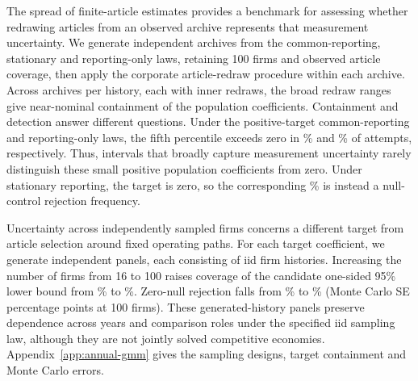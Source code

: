 The spread of finite-article estimates provides a benchmark for assessing
whether redrawing articles from an observed archive represents that
measurement uncertainty.
We generate independent archives from the common-reporting, stationary and
reporting-only laws, retaining 100 firms and observed article coverage, then
apply the corporate article-redraw procedure within each archive.
Across  archives per history, each
with  inner redraws, the broad redraw
ranges give near-nominal containment of the population coefficients.
Containment and detection answer different questions.
Under the positive-target common-reporting and reporting-only laws, the fifth
percentile exceeds zero in
\% and
\% of attempts, respectively.
Thus, intervals that broadly capture measurement uncertainty rarely distinguish
these small positive population coefficients from zero.
Under stationary reporting, the target is zero, so the corresponding
\% is instead a null-control
rejection frequency.

Uncertainty across independently sampled firms concerns a different target
from article selection around fixed operating paths.
For each target coefficient, we generate
 independent panels, each consisting
of iid firm histories.
Increasing the number of firms from 16 to 100 raises coverage of the
candidate one-sided 95\% lower bound from
\% to
\%.
Zero-null rejection falls from
\% to
\%
(Monte Carlo SE 
percentage points at 100 firms).
These generated-history panels preserve dependence across years and
comparison roles under the specified iid sampling law, although they are not
jointly solved competitive economies.
Appendix~\ref{app:annual-gmm} gives the sampling designs, target containment
and Monte Carlo errors.
